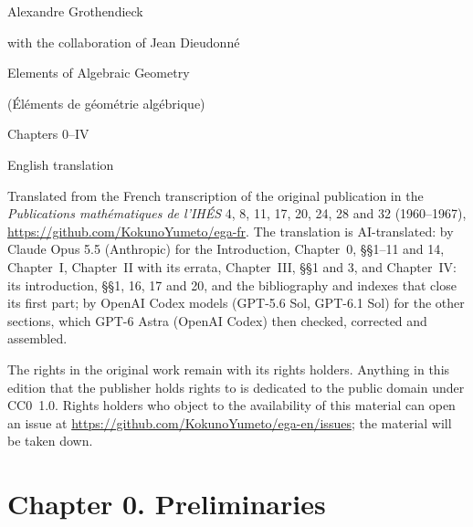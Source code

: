 \documentclass[10pt,oneside]{book}
\begin{document}
\begin{titlepage}\centering
{\Large Alexandre Grothendieck}\par\smallskip
{\large with the collaboration of Jean Dieudonné}\par\vspace{2em}
{\Huge Elements of Algebraic Geometry}\par\smallskip
{\large (\'El\'ements de g\'eom\'etrie alg\'ebrique)}\par\vspace{1.5em}
{\large Chapters 0--IV}\par\vfill
{\normalsize English translation}\par
\end{titlepage}
\noindent Translated from the French transcription of the original publication in the \emph{Publications
math\'ematiques de l'IH\'ES} 4, 8, 11, 17, 20, 24, 28 and 32 (1960--1967),
\url{https://github.com/KokunoYumeto/ega-fr}. The translation is AI-translated: by Claude Opus 5.5 (Anthropic) for
the Introduction, Chapter~0, \S\S1--11 and 14, Chapter~I, Chapter~II with its errata, Chapter~III, \S\S1 and 3,
and Chapter~IV: its introduction, \S\S1, 16, 17 and 20, and the bibliography and indexes that close its first part;
by OpenAI Codex models (GPT-5.6 Sol, GPT-6.1 Sol) for the other sections, which GPT-6 Astra (OpenAI Codex)
then checked, corrected and assembled.

The rights in the original work remain with its rights holders. Anything in this edition that the publisher holds
rights to is dedicated to the public domain under CC0~1.0. Rights holders who object to the availability of this
material can open an issue at \url{https://github.com/KokunoYumeto/ega-en/issues}; the material will be taken down.
\clearpage
\tableofcontents
\cleardoublepage{}

\chapter*{Chapter 0. Preliminaries}
\setcounter{section}{0}

\setcounter{section}{1}

\setcounter{section}{2}

\setcounter{section}{3}

\setcounter{section}{4}

\setcounter{section}{5}

\setcounter{section}{6}

\setcounter{section}{7}

\setcounter{section}{8}

\setcounter{section}{9}

\setcounter{section}{10}

\setcounter{section}{11}

\setcounter{section}{12}

\setcounter{section}{13}

\setcounter{section}{14}

\setcounter{section}{15}

\setcounter{section}{16}

\setcounter{section}{17}

\setcounter{section}{18}

\setcounter{section}{19}

\setcounter{section}{20}

\setcounter{section}{21}

\setcounter{section}{22}

\end{document}
